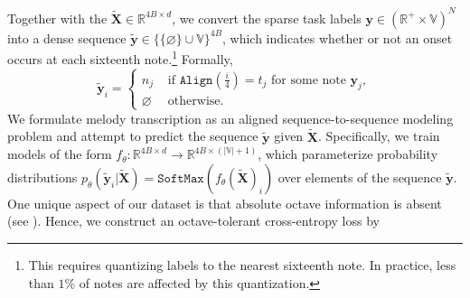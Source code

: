 Together with the \beatpooling{} ${\tilde{\bm{X}} \in \mathbb{R}^{4B\times d}}$, we convert 
the sparse task labels ${\bm{y} \in (\mathbb{R}^+ \times \mathbb{V})^N}$ into 
a dense sequence  
${\tilde{\bm{y}} \in \{\{\varnothing\}\cup\mathbb{V}\}^{4B}}$,
which indicates whether or not an onset occurs at each sixteenth note.\footnote{This requires quantizing labels to the nearest sixteenth note. In practice, less than $1\%$ of notes are affected by this quantization.} Formally, 
\[
\tilde{\bm{y}}_i =
\begin{cases}
n_j & \text{ if $\texttt{Align}(\frac{i}{4}) = t_j$ for some note $\bm{y}_j$}, \\
\varnothing & \text{ otherwise}.
\end{cases}
\]
We formulate melody transcription as an aligned sequence-to-sequence modeling problem and 
attempt to predict the sequence $\tilde{\bm{y}}$ given $\tilde{\bm{X}}$. Specifically, we train models of the form ${f_{\theta} : \mathbb{R}^{4B \times d} \to \mathbb{R}^{4B \times (|\mathbb{V}| + 1)}}$, which parameterize probability distributions  ${p_\theta(\tilde{\bm{y}}_i|\bm{\tilde{X}}) = \texttt{SoftMax}(f_{\theta}(\tilde{\bm{X}})_i)}$ over elements of the sequence $\tilde{\bm{y}}$.
One unique aspect of our dataset is that absolute octave information is absent (see ). 
Hence, we construct an octave-tolerant cross-entropy loss by 
